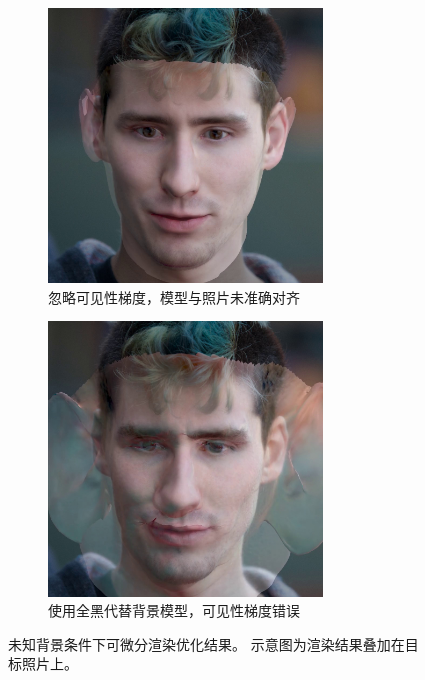 \begin{figure}
\centering
\begin{subfigure}[t]{0.5\textwidth}
    \centering
    \includegraphics[width=0.8\textwidth]{figures/black-bg_no-aa}
    \caption{忽略可见性梯度，模型与照片未准确对齐}
    \label{fig:problem_a}
\end{subfigure}%
\begin{subfigure}[t]{0.5\textwidth}
    \centering
    \includegraphics[width=0.8\textwidth]{figures/black-bg}
    \caption{使用全黑代替背景模型，可见性梯度错误}
    \label{fig:problem_b}
\end{subfigure}%
\caption[未知背景条件下可微分渲染优化结果]{
    未知背景条件下可微分渲染优化结果。
    示意图为渲染结果叠加在目标照片上。
}
\end{figure}

